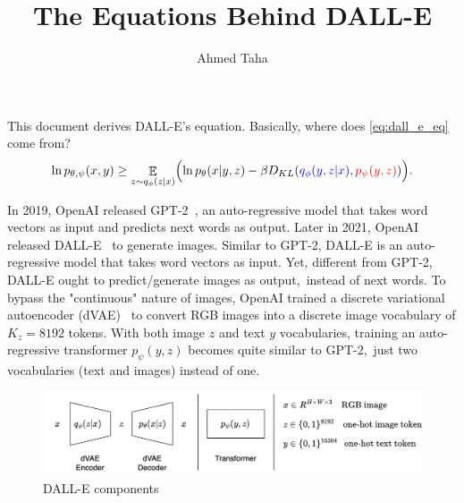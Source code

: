 \documentclass{article}
\DeclareMathOperator{\EX}{\mathbb{E}}%
\begin{document}
	


	
	\title{The Equations Behind DALL-E}
	\author{Ahmed Taha} %
	\date{}
	\maketitle
	
	This document derives DALL-E's equation. Basically, where does \autoref{eq:dall_e_eq} come from?
	\begin{equation}\label{eq:dall_e_eq}
		\ln p_{\theta,\psi}(x,y) \ge \mathop{\EX}_{z\sim q_\phi(z|x)}
		\Bigl(\ln p_\theta(x|y,z) -\beta D_{KL}(\textcolor{blue}{q_\phi(y,z|x)}, \textcolor{red}{p_\psi(y,z)})\Bigr).
	\end{equation}

	In 2019, OpenAI released GPT-2~\cite{radford2019language}, an auto-regressive model that takes word vectors as input and predicts next words as output. Later in 2021, OpenAI released DALL-E~\cite{ramesh2021zero} to generate images. Similar to GPT-2, DALL-E is an auto-regressive model that takes word vectors as input. Yet, different from GPT-2, DALL-E ought to predict/generate images as output,~\ie instead of next words. To bypass the "continuous" nature of images, OpenAI trained a discrete variational autoencoder (dVAE)~\cite{van2017neural,razavi2019generating} to convert RGB images into a discrete image vocabulary of $K_z=8192$ tokens. With both image $z$ and text $y$ vocabularies, training an auto-regressive transformer $p_{\psi}(y,z)$ becomes quite similar to GPT-2,~\ie just two vocabularies (text and images) instead of one.\\
	
		\begin{figure}[h]
		\centering
		\includegraphics[width=0.9\linewidth]{dalle_components}
		\caption{DALL-E components}
		\label{fig:dallecomponents}
	\end{figure}
\end{document}
